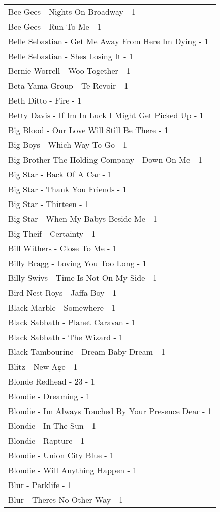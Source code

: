 \documentclass[
]{article}
\begin{document}
\begin{longtable}{l}
Bee Gees - Nights On Broadway - 1 \\ 
Bee Gees - Run To Me - 1 \\ 
Belle Sebastian - Get Me Away From Here Im Dying - 1 \\ 
Belle Sebastian - Shes Losing It - 1 \\ 
Bernie Worrell - Woo Together - 1 \\ 
Beta Yama Group - Te Revoir - 1 \\ 
Beth Ditto - Fire - 1 \\ 
Betty Davis - If Im In Luck I Might Get Picked Up - 1 \\ 
Big Blood - Our Love Will Still Be There - 1 \\ 
Big Boys - Which Way To Go - 1 \\ 
Big Brother The Holding Company - Down On Me - 1 \\ 
Big Star - Back Of A Car - 1 \\ 
Big Star - Thank You Friends - 1 \\ 
Big Star - Thirteen - 1 \\ 
Big Star - When My Babys Beside Me - 1 \\ 
Big Theif - Certainty - 1 \\ 
Bill Withers - Close To Me - 1 \\ 
Billy Bragg - Loving You Too Long - 1 \\ 
Billy Swivs - Time Is Not On My Side - 1 \\ 
Bird Nest Roys - Jaffa Boy - 1 \\ 
Black Marble - Somewhere - 1 \\ 
Black Sabbath - Planet Caravan - 1 \\ 
Black Sabbath - The Wizard - 1 \\ 
Black Tambourine - Dream Baby Dream - 1 \\ 
Blitz - New Age - 1 \\ 
Blonde Redhead - 23 - 1 \\ 
Blondie - Dreaming - 1 \\ 
Blondie - Im Always Touched By Your Presence Dear - 1 \\ 
Blondie - In The Sun - 1 \\ 
Blondie - Rapture - 1 \\ 
Blondie - Union City Blue - 1 \\ 
Blondie - Will Anything Happen - 1 \\ 
Blur - Parklife - 1 \\ 
Blur - Theres No Other Way - 1 \\ 

\end{longtable}
\end{document}
